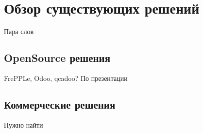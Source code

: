 \section{Обзор существующих решений}
Пара слов
\subsection{OpenSource решения}
FrePPLe, Odoo, qcadoo?
По презентации
\subsection{Коммерческие решения}
Нужно найти